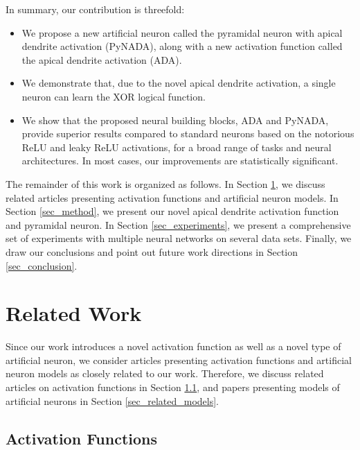 \documentclass[pdflatex,sn-mathphys]{sn-jnl}
\theoremstyle{thmstyleone}
\theoremstyle{thmstyletwo}\newtheorem{example}{Example}\newtheorem{remark}{Remark}
\theoremstyle{thmstylethree}\newtheorem{definition}{Definition}\DeclareMathOperator{\sinc}{sinc}
\begin{document}
In summary, our contribution is threefold:
\begin{itemize}
\item We propose a new artificial neuron called the pyramidal neuron with apical dendrite activation (PyNADA), along with a new activation function called the apical dendrite activation (ADA).
\item We demonstrate that, due to the novel apical dendrite activation, a single neuron can learn the XOR logical function.
\item We show that the proposed neural building blocks, ADA and PyNADA, provide superior results compared to standard neurons based on the notorious ReLU and leaky ReLU activations, for a broad range of tasks and neural architectures. In most cases, our improvements are statistically significant.
\end{itemize}

 The remainder of this work is organized as follows. In Section \ref{sec_related_art}, we discuss related articles presenting activation functions and artificial neuron models. In Section \ref{sec_method}, we present our novel apical dendrite activation function and pyramidal neuron. In Section \ref{sec_experiments}, we present a comprehensive set of experiments with multiple neural networks on several data sets. Finally, we draw our conclusions and point out future work directions in Section \ref{sec_conclusion}.
 
\section{Related Work}
\label{sec_related_art}

Since our work introduces a novel activation function as well as a novel type of artificial neuron, we consider articles presenting activation functions and artificial neuron models as closely related to our work. Therefore, we discuss related articles on activation functions in Section \ref{sec_related_activations}, and papers presenting models of artificial neurons in Section \ref{sec_related_models}.

\subsection{Activation Functions}
\label{sec_related_activations}
\end{document}
